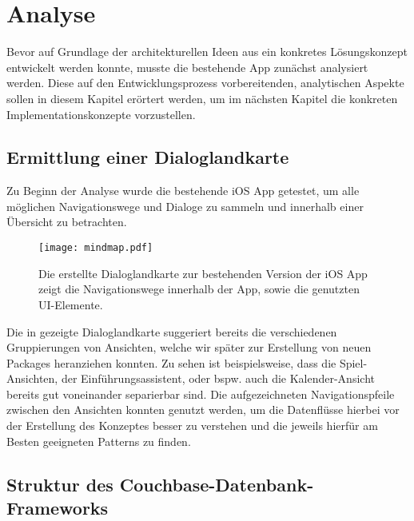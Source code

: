 \chapter{Analyse}\label{ch:analyse}

Bevor auf Grundlage der architekturellen Ideen aus  ein konkretes Lösungskonzept entwickelt werden konnte, musste die bestehende App zunächst analysiert werden. Diese auf den Entwicklungsprozess vorbereitenden, analytischen Aspekte sollen in diesem Kapitel erörtert werden, um im nächsten Kapitel die konkreten Implementationskonzepte vorzustellen.

\section{Ermittlung einer Dialoglandkarte}

Zu Beginn der Analyse wurde die bestehende iOS App getestet, um alle möglichen Navigationswege und Dialoge zu sammeln und innerhalb einer Übersicht zu betrachten.

\begin{figure}[h]
\texttt{[image: mindmap.pdf]}
\caption{Die erstellte Dialoglandkarte zur bestehenden Version der iOS App zeigt die Navigationswege innerhalb der App, sowie die genutzten UI-Elemente.}\label{fig:mindmap}
\end{figure}

\noindent Die in  gezeigte Dialoglandkarte suggeriert bereits die verschiedenen Gruppierungen von Ansichten, welche wir später zur Erstellung von neuen Packages heranziehen konnten. Zu sehen ist beispielsweise, dass die Spiel-Ansichten, der Einführungsassistent, oder bspw. auch die Kalender-Ansicht bereits gut voneinander separierbar sind. Die aufgezeichneten Navigationspfeile zwischen den Ansichten konnten genutzt werden, um die Datenflüsse hierbei vor der Erstellung des Konzeptes besser zu verstehen und die jeweils hierfür am Besten geeigneten Patterns zu finden.

\section{Struktur des Couchbase-Datenbank-Frameworks}

